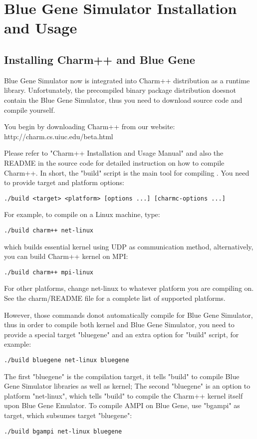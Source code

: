 \section{Blue Gene Simulator Installation and Usage}
\label{install}

\subsection{Installing Charm++ and Blue Gene}

Blue Gene Simulator now is integrated into Charm++ distribution as a runtime 
library. Unfortunately, the precompiled binary package distribution doesnot 
contain the Blue Gene Simulator, thus you need to download source code
and compile yourself. 

You begin by downloading Charm++ from our website:
http://charm.cs.uiuc.edu/beta.html

Please refer to "Charm++ Installation and Usage Manual" and also the README
in the source code for detailed instruction on how to compile Charm++.
In short, the "build" script is the main tool for compiling \charmpp{}.
You need to provide target and platform options:
\begin{verbatim}
./build <target> <platform> [options ...] [charmc-options ...]
\end{verbatim}

For example, to compile on a Linux machine, type:
\begin{verbatim}
./build charm++ net-linux
\end{verbatim}

which builds essential \charmpp{} kernel using UDP as communication method, 
alternatively, you can build Charm++ kernel on MPI:
\begin{verbatim}
./build charm++ mpi-linux
\end{verbatim}

For other platforms, change net-linux to whatever platform you are compiling 
on. See the charm/README file for a complete list of supported platforms.

However, those commands donot automatically compile for Blue Gene Simulator, 
thus in order to compile both \charmpp{} kernel and Blue Gene Simulator, 
you need to provide a special target "bluegene" and an extra option for 
"build" script, for example:
\begin{verbatim}
./build bluegene net-linux bluegene
\end{verbatim}

The first "bluegene" is the compilation target, it tells "build" to
compile Blue Gene Simulator libraries as well as \charmpp{} kernel;
The second "bluegene" is an option to platform "net-linux", which tells
"build" to compile the Charm++ kernel itself upon Blue Gene Emulator. 
To compile AMPI on Blue Gene, use "bgampi" as target, which subsumes target
"bluegene":
\begin{verbatim}
./build bgampi net-linux bluegene
\end{verbatim}

